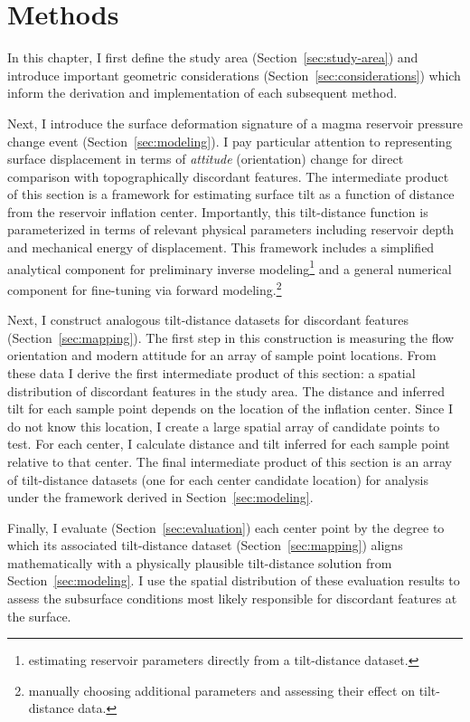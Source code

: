 \chapter{Methods}\label{cha:methods}

In this chapter, I first define the study area (Section~\ref{sec:study-area}) and introduce important geometric considerations (Section~\ref{sec:considerations}) which inform the derivation and implementation of each subsequent method.

Next, I introduce the surface deformation signature of a magma reservoir pressure change event (Section~\ref{sec:modeling}). I pay particular attention to representing surface displacement in terms of \emph{attitude} (orientation) change for direct comparison with topographically discordant features. The intermediate product of this section is a framework for estimating surface tilt as a function of distance from the reservoir inflation center. Importantly, this tilt-distance function is parameterized in terms of relevant physical parameters including reservoir depth and mechanical energy of displacement. This framework includes a simplified analytical component for preliminary inverse modeling\footnote{estimating reservoir parameters directly from a tilt-distance dataset.} and a general numerical component for fine-tuning via forward modeling.\footnote{manually choosing additional parameters and assessing their effect on tilt-distance data.}

Next, I construct analogous tilt-distance datasets for discordant features (Section~\ref{sec:mapping}). The first step in this construction is measuring the flow orientation and modern attitude for an array of sample point locations. From these data I derive the first intermediate product of this section: a spatial distribution of discordant features in the study area. The distance and inferred tilt for each sample point depends on the location of the inflation center. Since I do not know this location, I create a large spatial array of candidate points to test. For each center, I calculate distance and tilt inferred for each sample point relative to that center. The final intermediate product of this section is an array of tilt-distance datasets (one for each center candidate location) for analysis under the framework derived in Section~\ref{sec:modeling}.

Finally, I evaluate (Section~\ref{sec:evaluation}) each center point by the degree to which its associated tilt-distance dataset (Section~\ref{sec:mapping}) aligns mathematically with a physically plausible tilt-distance solution from Section~\ref{sec:modeling}. I use the spatial distribution of these evaluation results to assess the subsurface conditions most likely responsible for discordant features at the surface.





